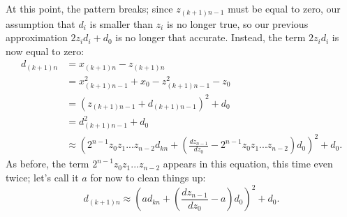 \documentclass[12pt,a4paper]{article}
\begin{document}
At this point, the pattern breaks; since $z_{(k+1)n-1}$ must be equal to zero, our assumption that $d_i$ is smaller than $z_i$ is no longer true, so our previous approximation $2z_id_i+d_0$ is no longer that accurate. Instead, the term $2z_id_i$ is now equal to zero:
\begin{align*}
	d_{(k+1)n}&=x_{(k+1)n}-z_{(k+1)n}\\
	&=x_{(k+1)n-1}^2+x_0-z_{(k+1)n-1}^2-z_0\\
	&=(z_{(k+1)n-1}+d_{(k+1)n-1})^2+d_0\\
	&=d_{(k+1)n-1}^2+d_0\\
	&\approx (2^{n-1}z_0z_1...z_{n-2}d_{kn}+(\frac{dz_{n-1}}{dz_0}-2^{n-1}z_0z_1...z_{n-2})d_0)^2+d_0.
\end{align*}
As before, the term $2^{n-1}z_0z_1...z_{n-2}$ appears in this equation, this time even twice; let's call it $a$ for now to clean things up:
$$d_{(k+1)n}\approx (ad_{kn}+(\frac{dz_{n-1}}{dz_0}-a)d_0)^2+d_0.$$
\end{document}

